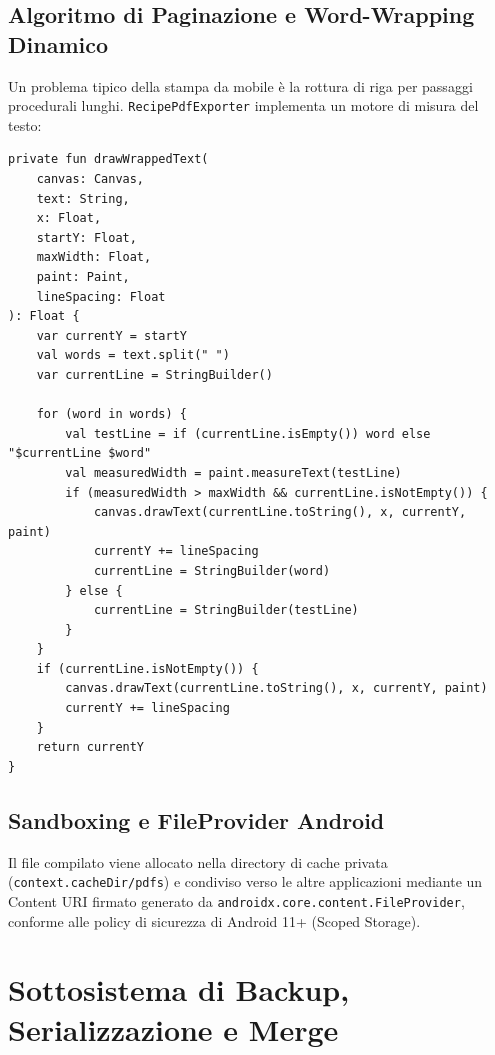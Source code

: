 \documentclass[11pt,a4paper,titlepage]{article}
\begin{document}
\subsection{Algoritmo di Paginazione e Word-Wrapping Dinamico}
Un problema tipico della stampa da mobile \`e la rottura di riga per passaggi procedurali lunghi. \texttt{RecipePdfExporter} implementa un motore di misura del testo:
\begin{lstlisting}[caption={Word-wrapping dinamico su Canvas}]
private fun drawWrappedText(
    canvas: Canvas,
    text: String,
    x: Float,
    startY: Float,
    maxWidth: Float,
    paint: Paint,
    lineSpacing: Float
): Float {
    var currentY = startY
    val words = text.split(" ")
    var currentLine = StringBuilder()

    for (word in words) {
        val testLine = if (currentLine.isEmpty()) word else "$currentLine $word"
        val measuredWidth = paint.measureText(testLine)
        if (measuredWidth > maxWidth && currentLine.isNotEmpty()) {
            canvas.drawText(currentLine.toString(), x, currentY, paint)
            currentY += lineSpacing
            currentLine = StringBuilder(word)
        } else {
            currentLine = StringBuilder(testLine)
        }
    }
    if (currentLine.isNotEmpty()) {
        canvas.drawText(currentLine.toString(), x, currentY, paint)
        currentY += lineSpacing
    }
    return currentY
}
\end{lstlisting}

\subsection{Sandboxing e FileProvider Android}
Il file compilato viene allocato nella directory di cache privata (\texttt{context.cacheDir/pdfs}) e condiviso verso le altre applicazioni mediante un Content URI firmato generato da \linebreak \texttt{androidx.core.content.FileProvider}, conforme alle policy di sicurezza di Android 11+ (Scoped Storage). 

\section{Sottosistema di Backup, Serializzazione e Merge}
\end{document}
